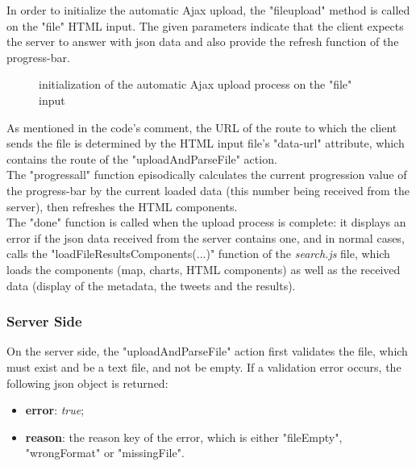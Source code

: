 \documentclass[a4paper,11pt]{report}
\begin{document}
In order to initialize the automatic Ajax upload, the "fileupload" method is called on the "file" HTML input. The given parameters indicate that the client expects the server to answer with json data and also provide the refresh function of the progress-bar.
\begin{figure}[H]
\vspace{-5pt}
\begin{center}
\vspace{-5pt}
\caption{initialization of the automatic Ajax upload process on the "file" input}
\end{center}
\end{figure}

As mentioned in the code's comment, the URL of the route to which the client sends the file is determined by the HTML input file's "data-url" attribute, which contains the route of the "uploadAndParseFile" action.\\

The "progressall" function episodically calculates the current progression value of the progress-bar by the current loaded data (this number being received from the server), then refreshes the HTML components.\\

The "done" function is called when the upload process is complete: it displays an error if the json data received from the server contains one, and in normal cases, calls the "loadFileResultsComponents(...)" function of the \emph{search.js} file, which loads the components (map, charts, HTML components) as well as the received data (display of the metadata, the tweets and the results).
\bigskip

\subsubsection{Server Side}
On the server side, the "uploadAndParseFile" action first validates the file, which must exist and be a text file, and not be empty. If a validation error occurs, the following json object is returned:
\begin{itemize}
	\item \textbf{error}: \emph{true};
	\item \textbf{reason}: the reason key of the error, which is either "fileEmpty", "wrongFormat" or "missingFile".
\end{itemize}
\newpage
\end{document}
